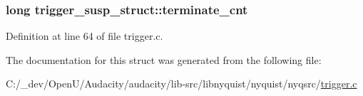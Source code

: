 \subsubsection[{\texorpdfstring{terminate\+\_\+cnt}{terminate_cnt}}]{\setlength{\rightskip}{0pt plus 5cm}long trigger\+\_\+susp\+\_\+struct\+::terminate\+\_\+cnt}\hypertarget{structtrigger__susp__struct_ab6298937f1d495007331e6779439bd84}{}\label{structtrigger__susp__struct_ab6298937f1d495007331e6779439bd84}


Definition at line 64 of file trigger.\+c.



The documentation for this struct was generated from the following file\+:\begin{DoxyCompactItemize}
\item 
C\+:/\+\_\+dev/\+Open\+U/\+Audacity/audacity/lib-\/src/libnyquist/nyquist/nyqsrc/\hyperlink{trigger_8c}{trigger.\+c}\end{DoxyCompactItemize}
